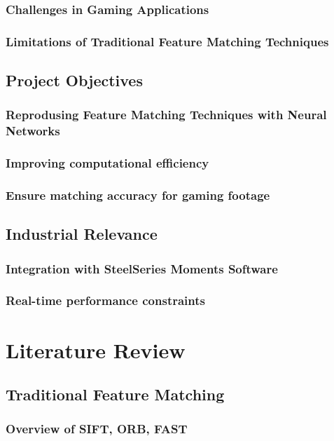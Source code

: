 \documentclass[a4paper,12pt]{report}
\begin{document}
\subsection{Challenges in Gaming Applications}
\subsection{Limitations of Traditional Feature Matching Techniques}

\section{Project Objectives}
\subsection{Reprodusing Feature Matching Techniques with Neural Networks}
\subsection{Improving computational efficiency}
\subsection{Ensure matching accuracy for gaming footage}

\section{Industrial Relevance}
\subsection{Integration with SteelSeries Moments Software}
\subsection{Real-time performance constraints}

\chapter{Literature Review}
\section{Traditional Feature Matching}
\subsection{Overview of SIFT, ORB, FAST}
\end{document}

